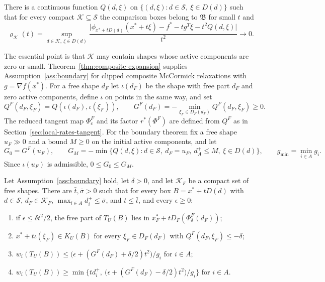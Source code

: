 \begin{assumption}\label{ass:boundary}
There is a continuous function $Q(d,\xi)$ on
$\{(d,\xi):d\in\mathcal S,\ \xi\in D(d)\}$ such that for every compact
$\mathcal K\subseteq\mathcal S$ the comparison boxes belong to $\mathfrak B$
for small $t$ and
\[
  \varrho_{\mathcal K}(t)=\sup_{d\in\mathcal K,\ \xi\in D(d)}
  \frac{\bigl|\phi_{x^*+tD(d)}(x^*+t\xi)-f^*-tg^T\xi-t^2Q(d,\xi)\bigr|}{t^2}
  \longrightarrow0.
\]
\end{assumption}

The essential point is that $\mathcal K$ may contain shapes whose active
components are zero or small. Theorem~\ref{thm:composite-expansion}
supplies Assumption~\ref{ass:boundary} for clipped composite McCormick
relaxations with $g=\nabla f(x^*)$. For a free shape $d_F$ let $\iota(d_F)$ be
the shape with free part $d_F$ and zero active components, define $\iota$
on points in the same way, and set
\[
  Q^F(d_F,\xi_F)=Q(\iota(d_F),\iota(\xi_F)),\qquad
  G^F(d_F)=-\min_{\xi_F\in D_F(d_F)}Q^F(d_F,\xi_F)\ge0.
\]
The reduced tangent map $\Phi^F_c$ and its factor $r^*(\Phi^F)$ are defined
from $Q^F$ as in Section~\ref{sec:local-rates-tangent}. For the boundary
theorem fix a free shape $u_F\gg0$ and a bound $M\ge0$ on the initial
active components, and let
\[
  G_0=G^F(u_F),\qquad
  G_M=-\min\{Q(d,\xi):d\in\mathcal S,\ d_F=u_F,\ d_A^+\le M,\ \xi\in D(d)\},
  \qquad g_{\min}=\min_{i\in A}g_i.
\]
Since $\iota(u_F)$ is admissible, $0\le G_0\le G_M$.

\begin{lemma}\label{lem:boundary-step}
Let Assumption~\ref{ass:boundary} hold, let $\delta>0$, and let $\mathcal K_F$
be a compact set of free shapes. There are $\bar t,\bar\sigma>0$ such that
for every box $B=x^*+tD(d)$ with $d\in\mathcal S$, $d_F\in\mathcal K_F$,
$\max_{i\in A}d_i^+\le\bar\sigma$, and $t\le\bar t$, and every $\epsilon\ge0$:
\begin{enumerate}[label=(\roman*)]
\item if $\epsilon\le\delta t^2/2$, the free part of $T_U(B)$ lies in
  $x_F^*+tD_F(\Phi^F_\delta(d_F))$;
\item $x^*+t\iota(\xi_F)\in K_U(B)$ for every $\xi_F\in D_F(d_F)$ with
  $Q^F(d_F,\xi_F)\le-\delta$;
\item $w_i(T_U(B))\le\bigl(\epsilon+(G^F(d_F)+\delta/2)t^2\bigr)/g_i$ for
  $i\in A$;
\item $w_i(T_U(B))\ge\min\bigl\{td_i^+,\ \bigl(\epsilon+(G^F(d_F)-\delta/2)t^2\bigr)/g_i\bigr\}$
  for $i\in A$.
\end{enumerate}
\end{lemma}

